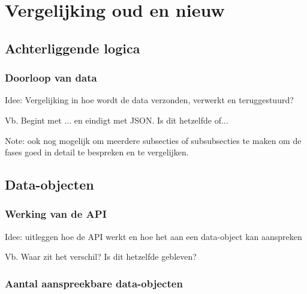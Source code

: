 
\chapter{Vergelijking oud en nieuw}%
\label{ch:vergelijking}


\section{Achterliggende logica}

\subsection{Doorloop van data}

Idee: Vergelijking in hoe wordt de data verzonden, verwerkt en teruggestuurd?

Vb. Begint met ... en eindigt met JSON. Is dit hetzelfde of...

Note: ook nog mogelijk om meerdere subsecties of subsubsecties te maken om de fases goed in detail te bespreken en te vergelijken.

\section{Data-objecten}

\subsection{Werking van de API}

Idee: uitleggen hoe de API werkt en hoe het aan een data-object kan aanspreken

Vb. Waar zit het verschil? Is dit hetzelfde gebleven?

\subsection{Aantal aanspreekbare data-objecten}

